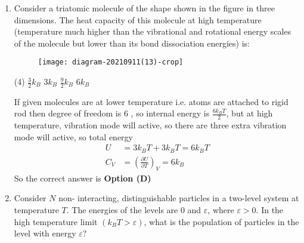 \begin{enumerate}
	\begin{tasks}(4)
		\task[\textbf{A.}] (a) $\frac{E e^{\frac{-E}{k_{B} T}}}{1+3 e^{\frac{-E}{k_{B} T}}}$
		\task[\textbf{B.}] $\frac{E e^{\frac{-E}{k_{B} T}}}{1+e^{\frac{-E}{k_{s} T}}}$
		\task[\textbf{C.}] $\frac{3 E e^{\frac{-E}{k_{B} T}}}{1+e^{\frac{-E}{k_{B} T}}}$
		\task[\textbf{D.}] $\frac{3 E e^{\frac{-E}{k_{B} T}}}{1+3 e^{\frac{-E}{k_{s} T}}}$
	\end{tasks}
	\begin{answer}
		\begin{align*}
		\langle E\rangle&=\frac{\sum_{i} g_{i} E_{i} e^{-\frac{E_{i}}{k T}}}{\sum_{i} g_{i} e^{-\frac{E_{i}}{k T}}}=\frac{0 \times e^{-\frac{0}{k T}}+3 \times E \times e^{-\frac{E}{k T}}}{e^{-\frac{0}{k T}}+3 \times e^{-\frac{E}{k T}}}=\frac{3 E e^{\frac{-E}{k_{B} T}}}{1+3 e^{\frac{-E}{k_{B} T}}}
		\end{align*}
		So the correct answer is \textbf{Option (D)}
	\end{answer}	
	\item Consider a triatomic molecule of the shape shown in the figure in three dimensions. The heat capacity of this molecule at high temperature (temperature much higher than the vibrational and rotational energy scales of the molecule but lower than its bond dissociation energies) is:
	{}
	\begin{figure}[H]
		\centering
		\texttt{[image: diagram-20210911(13)-crop]}
	\end{figure}
	\begin{tasks}(4)
		\task[\textbf{A.}] $\frac{3}{2} k_{B}$
		\task[\textbf{B.}] $3 k_{B}$
		\task[\textbf{C.}] $\frac{9}{2} k_{B}$
		\task[\textbf{D.}] $6 k_{B}$
	\end{tasks}
	\begin{answer}
		If given molecules are at lower temperature i.e. atoms are attached to rigid rod then degree of freedom is 6 , so internal energy is $\frac{6 k_{B} T}{2}$, but at high temperature, vibration mode will active, so there are three extra vibration mode will active, so total energy
		\begin{align*}
		U&=3 k_{B} T+3 k_{B} T=6 k_{B} T\\
		C_{V}&=\left(\frac{\partial U}{\partial T}\right)_{V}=6 k_{B}
		\end{align*}
		So the correct answer is \textbf{Option (D)}
	\end{answer}	
	\item Consider $N$ non- interacting, distinguishable particles in a two-level system at temperature $T$. The energies of the levels are 0 and $\varepsilon$, where $\varepsilon>0$. In the high temperature limit $\left(k_{B} T>\varepsilon\right)$, what is the population of particles in the level with energy $\varepsilon ?$

\end{enumerate}
